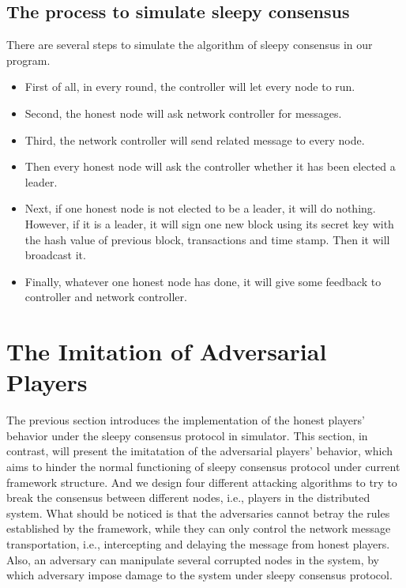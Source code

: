 \documentclass{llncs}
\begin{document}
\subsection{The process to simulate sleepy consensus}
There are several steps to simulate the algorithm of sleepy consensus in our program.
\begin{itemize}
	\item First of all, in every round, the controller will 	let every node to run.\\ 
	\item Second, the honest node will ask network controller for messages.\\
	\item Third, the network controller will send related message to every node.\\ 
	\item Then every honest node will ask the controller whether it  has been elected a leader.\\
	\item Next, if one honest node is not elected to be a leader, it will do nothing. However, if it is a leader, it will sign one new block using its secret key with the hash value of previous block, transactions and time stamp. Then it will broadcast it.\\
	\item Finally, whatever one honest node has done, it will give some feedback to controller and network controller.\\
\end{itemize}
%
\section{The Imitation of Adversarial Players}
\quad The previous section introduces the implementation of the honest players' behavior under the sleepy consensus protocol in simulator. This section, in contrast, will present the imitatation of the adversarial players' behavior, which aims to hinder the normal functioning of sleepy consensus protocol under current framework structure. And we design four different attacking algorithms to try to break the consensus between different nodes, i.e., players in the distributed system. What should be noticed is that the adversaries cannot betray the rules established by the framework, while they can only control the network message transportation, i.e., intercepting and delaying the message from honest players. Also, an adversary can manipulate several corrupted nodes in the system, by which adversary impose damage to the system under sleepy consensus protocol.
\end{document}
